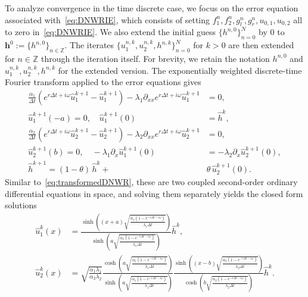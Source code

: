 \documentclass[10pt,a4paper]{amsart}
\begin{document}
To analyze convergence in the time discrete case, we focus on the error equation associated with~\eqref{eq:DNWRIE}, which consists of setting $f_1^n, f_2^n, g_l^n, g_r^n, u_{0, 1}, u_{0, 2}$ all to zero in~\eqref{eq:DNWRIE}. We also extend the initial guess $\{h^{n, 0}\}_{n=0}^{N}$ by 0 to $\boldsymbol{h}^0 :=\{h^{n,0}\}_{n\in\mathbb{Z}}$. The iterates $\{u_1^{n, k}, u_2^{n, k}, h^{n, k}\}_{n=0}^N$ for $k>0$ are then extended for $n\in\mathbb{Z}$ through the iteration itself. For brevity, we retain the notation $h^{n, 0}$ and $u_1^{n, k}, u_2^{n, k}, h^{n, k}$ for the extended version. 
The exponentially weighted discrete-time Fourier transform applied to the error equations gives
\begin{equation}\label{eq:transformedDNWRIE}
\begin{aligned}
	\frac{\alpha_1}{\Delta t} (e^{r \Delta t + i \omega} \widehat u^{k+1}_1 - \widehat u^{k+1}_1) - \lambda_1  \partial_{xx} e^{r \Delta t + i \omega} \widehat u^{k+1}_1 &= 0, \\
	\widehat u^{k+1}_1(-a) = 0, \quad
	\widehat u^{k+1}_1(0) &= \widehat h^k, \\
	\frac{\alpha_2}{\Delta t} (e^{r \Delta t + i \omega} \widehat u_2^{k+1} - \widehat u_2^{k+1}) - \lambda_2  \partial_{xx} e^{r \Delta t + i \omega} \widehat u_2^{k+1} &= 0, \\
	\widehat u^{k+1}_2(b) = 0, \quad
	-\lambda_1 \partial_x \widehat u^{k+1}_1(0) &= -\lambda_2 \partial_x \widehat u^{k+1}_2(0), \\
	\widehat h^{k+1} = (1 - \theta)\,\widehat h^{k} + &\theta\,\widehat u^{k+1}_2(0).
\end{aligned}
\end{equation}
Similar to~\eqref{eq:transformedDNWR}, these are two coupled second-order ordinary differential equations in space, and solving them separately yields the closed form solutions
\[\begin{aligned}
	\widehat u_1^k(x) &= \frac{\sinh\left((x+a)\sqrt{\frac{\alpha_1(1-e^{-r \Delta t - i\omega})}{\lambda_1\Delta t}}\right)}{\sinh\left(a\sqrt{\frac{\alpha_1(1-e^{-r \Delta t -i \omega})}{\lambda_1\Delta t}}\right)} \widehat h^k, \\
	\widehat u_2^k(x) &= \sqrt{\frac{\alpha_1\lambda_1}{\alpha_2\lambda_2}}\frac{\cosh\left(a\sqrt{\frac{\alpha_1(1-e^{-r \Delta t -i \omega})}{\lambda_1\Delta t}}\right)}{\sinh\left(a\sqrt{\frac{\alpha_1(1-e^{-r \Delta t -i \omega})}{\lambda_1\Delta t}}\right)}\frac{\sinh\left((x-b)\sqrt{\frac{\alpha_2(1-e^{-r \Delta t -i \omega})}{\lambda_2\Delta t}}\right)}{\cosh\left(b\sqrt{\frac{\alpha_2(1-e^{-r \Delta t -i \omega})}{\lambda_2\Delta t}}\right)} \widehat h^k.
\end{aligned}\]
\end{document}
